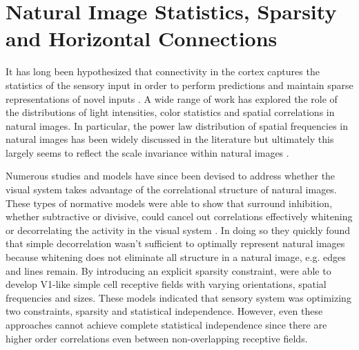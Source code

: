 \section{Natural Image Statistics, Sparsity and Horizontal Connections}

It has long been hypothesized that connectivity in the cortex captures
the statistics of the sensory input in order to perform predictions
and maintain sparse representations of novel inputs
\citep{Simoncelli2001}. A wide range of work has explored the role of
the distributions of light intensities, color statistics and spatial
correlations in natural images. In particular, the power law
distribution of spatial frequencies in natural images has been widely
discussed in the literature but ultimately this largely seems to
reflect the scale invariance within natural images
\citep{Ruderman1997}.

Numerous studies and models have since been devised to address whether
the visual system takes advantage of the correlational structure of
natural images. These types of normative models were able to show that
surround inhibition, whether subtractive or divisive, could cancel out
correlations effectively whitening or decorrelating the activity in
the visual system \citep{Srinivasan1982, Atick1992}. In doing so they
quickly found that simple decorrelation wasn't sufficient to optimally
represent natural images because whitening does not eliminate all
structure in a natural image, e.g. edges and lines remain. By
introducing an explicit sparsity constraint, \cite{Olshausen1996} were
able to develop V1-like simple cell receptive fields with varying
orientations, spatial frequencies and sizes. These models indicated
that sensory system was optimizing two constraints, sparsity and
statistical independence. However, even these approaches cannot
achieve complete statistical independence since there are higher order
correlations even between non-overlapping receptive fields.

